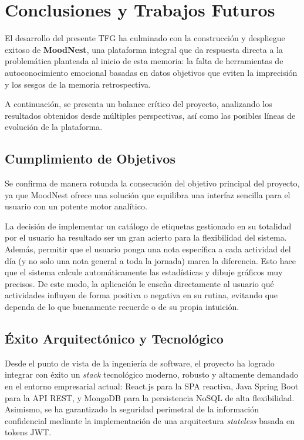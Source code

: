 \newpage{}
\section{Conclusiones y Trabajos Futuros}
\label{sec:conclusiones}

El desarrollo del presente TFG ha culminado con la construcción y despliegue exitoso de \textbf{MoodNest}, una plataforma integral que da respuesta directa a la problemática planteada al inicio de esta memoria: la falta de herramientas de autoconocimiento emocional basadas en datos objetivos que eviten la imprecisión y los sesgos de la memoria retrospectiva.

A continuación, se presenta un balance crítico del proyecto, analizando los resultados obtenidos desde múltiples perspectivas, así como las posibles líneas de evolución de la plataforma.

\subsection{Cumplimiento de Objetivos}

Se confirma de manera rotunda la consecución del objetivo principal del proyecto, ya que MoodNest ofrece una solución que equilibra una interfaz sencilla para el usuario con un potente motor analítico. 

La decisión de implementar un catálogo de etiquetas gestionado en su totalidad por el usuario ha resultado ser un gran acierto para la flexibilidad del sistema. Además, permitir que el usuario ponga una nota específica a cada actividad del día (y no solo una nota general a toda la jornada) marca la diferencia. Esto hace que el sistema calcule automáticamente las estadísticas y dibuje gráficos muy precisos. De este modo, la aplicación le enseña directamente al usuario qué actividades influyen de forma positiva o negativa en su rutina, evitando que dependa de lo que buenamente recuerde o de su propia intuición.
\subsection{Éxito Arquitectónico y Tecnológico}

Desde el punto de vista de la ingeniería de software, el proyecto ha logrado integrar con éxito un \textit{stack} tecnológico moderno, robusto y altamente demandado en el entorno empresarial actual: React.js para la SPA reactiva, Java Spring Boot para la API REST, y MongoDB para la persistencia NoSQL de alta flexibilidad. Asimismo, se ha garantizado la seguridad perimetral de la información confidencial mediante la implementación de una arquitectura \textit{stateless} basada en tokens JWT.

